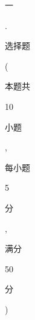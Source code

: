 \documentclass[10pt]{article}
\begin{document}
\begin{CJK}{UTF8}{mj}一\end{CJK}. \begin{CJK}{UTF8}{mj}选择题\end{CJK} (\begin{CJK}{UTF8}{mj}本题共\end{CJK} 10 \begin{CJK}{UTF8}{mj}小题\end{CJK}, \begin{CJK}{UTF8}{mj}每小题\end{CJK} 5 \begin{CJK}{UTF8}{mj}分\end{CJK}, \begin{CJK}{UTF8}{mj}满分\end{CJK} 50 \begin{CJK}{UTF8}{mj}分\end{CJK})
\end{document}
